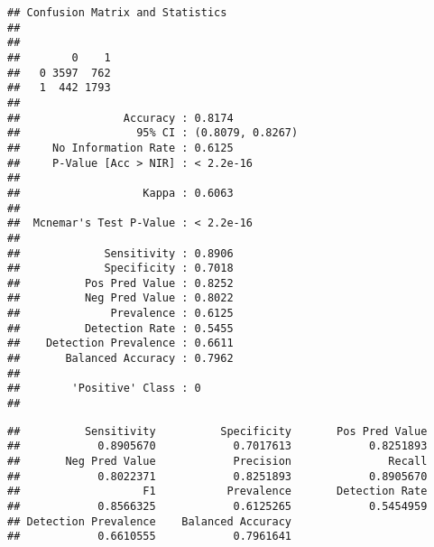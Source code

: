 \documentclass[
]{article}
\newenvironment{Shaded}{\begin{snugshade}}{\end{snugshade}}
\newcommand{\FloatTok}[1]{\textcolor[rgb]{0.00,0.00,0.81}{#1}}
\newcommand{\FunctionTok}[1]{\textcolor[rgb]{0.00,0.00,0.00}{#1}}
\newcommand{\NormalTok}[1]{#1}
\newcommand{\OtherTok}[1]{\textcolor[rgb]{0.56,0.35,0.01}{#1}}
\newcommand{\SpecialCharTok}[1]{\textcolor[rgb]{0.00,0.00,0.00}{#1}}
\begin{document}
\begin{Shaded}
\end{Shaded}

\begin{verbatim}
## Confusion Matrix and Statistics
## 
##    
##        0    1
##   0 3597  762
##   1  442 1793
##                                           
##                Accuracy : 0.8174          
##                  95% CI : (0.8079, 0.8267)
##     No Information Rate : 0.6125          
##     P-Value [Acc > NIR] : < 2.2e-16       
##                                           
##                   Kappa : 0.6063          
##                                           
##  Mcnemar's Test P-Value : < 2.2e-16       
##                                           
##             Sensitivity : 0.8906          
##             Specificity : 0.7018          
##          Pos Pred Value : 0.8252          
##          Neg Pred Value : 0.8022          
##              Prevalence : 0.6125          
##          Detection Rate : 0.5455          
##    Detection Prevalence : 0.6611          
##       Balanced Accuracy : 0.7962          
##                                           
##        'Positive' Class : 0               
## 
\end{verbatim}

\begin{Shaded}
\end{Shaded}

\begin{verbatim}
##          Sensitivity          Specificity       Pos Pred Value 
##            0.8905670            0.7017613            0.8251893 
##       Neg Pred Value            Precision               Recall 
##            0.8022371            0.8251893            0.8905670 
##                   F1           Prevalence       Detection Rate 
##            0.8566325            0.6125265            0.5454959 
## Detection Prevalence    Balanced Accuracy 
##            0.6610555            0.7961641
\end{verbatim}
\end{document}
